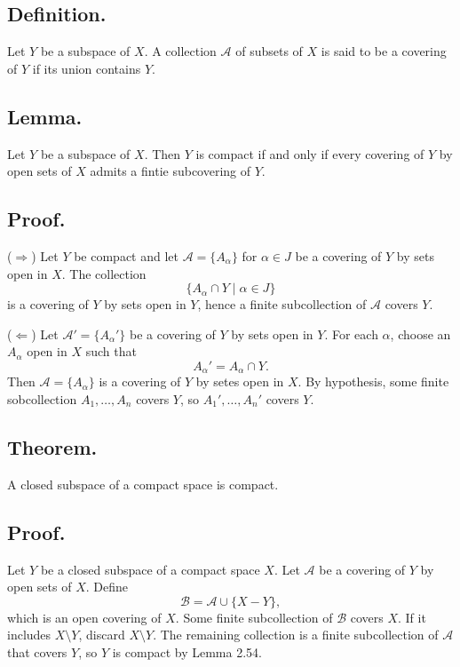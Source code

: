 \documentclass[titlepage]{article}
\begin{document}
\subsection{Definition.} Let $Y$ be a subspace of $X$. A collection $\mathcal{A}$ of subsets of $X$ is said to be a covering of $Y$ if its union contains $Y$.

\subsection{Lemma.} Let $Y$ be a subspace of $X$. Then $Y$ is compact if and only if every covering of $Y$ by open sets of $X$ admits a fintie subcovering of $Y$.

\subsection{Proof.} 

($\Rightarrow$) Let $Y$ be compact and let $\mathcal{A} = \{A_{\alpha}\}$ for $\alpha \in J$ be a covering of $Y$ by sets open in $X$. The collection 
$$\{A_{\alpha} \cap Y \mid \alpha \in J\}$$
is a covering of $Y$ by sets open in $Y$, hence a finite subcollection of $\mathcal{A}$ covers $Y$.

($\Leftarrow$) Let $\mathcal{A}' = \{A_{\alpha}'\}$ be a covering of $Y$ by sets open in $Y$. For each $\alpha$, choose an $A_{\alpha}$ open in $X$ such that 
$$A_{\alpha}' = A_{\alpha} \cap Y.$$
Then $\mathcal{A} = \{A_{\alpha}\}$ is a covering of $Y$ by setes open in $X$. By hypothesis, some finite sobcollection $A_{1}, \ldots, A_{n}$ covers $Y$, so $A_{1}', \ldots, A_{n}'$ covers $Y$.

\subsection{Theorem.} A closed subspace of a compact space is compact.

\subsection{Proof.} Let $Y$ be a closed subspace of a compact space $X$. Let $\mathcal{A}$ be a covering of $Y$ by open sets of $X$. Define 
$$\mathcal{B} = \mathcal{A} \cup \{X - Y\},$$
which is an open covering of $X$. Some finite subcollection of $\mathcal{B}$ covers $X$. If it includes $X \setminus Y$, discard $X \setminus Y$. The remaining collection is a finite subcollection of $\mathcal{A}$ that covers $Y$, so $Y$ is compact by Lemma 2.54.
\end{document}
